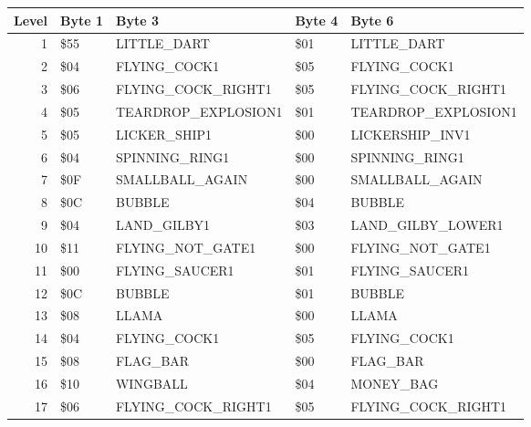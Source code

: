 \begin{figure}[H]
  {
  \setlength{\tabcolsep}{3.0pt}
  \setlength\cmidrulewidth{\heavyrulewidth} %
  \begin{adjustbox}{width=\textwidth}

\begin{tabular}{rllll}
\toprule
   Level & Byte 1    & Byte 3              & Byte 4    & Byte 6                  \\
\midrule
       1 & \$55       & LITTLE\_DART         & \$01       & LITTLE\_DART             \\
       2 & \$04       & FLYING\_COCK1        & \$05       & FLYING\_COCK1            \\
       3 & \$06       & FLYING\_COCK\_RIGHT1  & \$05       & FLYING\_COCK\_RIGHT1      \\
       4 & \$05       & TEARDROP\_EXPLOSION1 & \$01       & TEARDROP\_EXPLOSION1     \\
       5 & \$05       & LICKER\_SHIP1        & \$00       & LICKERSHIP\_INV1         \\
       6 & \$04       & SPINNING\_RING1      & \$00       & SPINNING\_RING1          \\
       7 & \$0F       & SMALLBALL\_AGAIN     & \$00       & SMALLBALL\_AGAIN         \\
       8 & \$0C       & BUBBLE              & \$04       & BUBBLE                  \\
       9 & \$04       & LAND\_GILBY1         & \$03       & LAND\_GILBY\_LOWER1 \\
      10 & \$11       & FLYING\_NOT\_GATE1    & \$00       & FLYING\_NOT\_GATE1        \\
      11 & \$00       & FLYING\_SAUCER1      & \$01       & FLYING\_SAUCER1          \\
      12 & \$0C       & BUBBLE              & \$01       & BUBBLE                  \\
      13 & \$08       & LLAMA               & \$00       & LLAMA                   \\
      14 & \$04       & FLYING\_COCK1        & \$05       & FLYING\_COCK1            \\
      15 & \$08       & FLAG\_BAR            & \$00       & FLAG\_BAR                \\
      16 & \$10       & WINGBALL            & \$04       & MONEY\_BAG               \\
      17 & \$06       & FLYING\_COCK\_RIGHT1  & \$05       & FLYING\_COCK\_RIGHT1      \\

\end{tabular}
\end{adjustbox}}
\end{figure}
